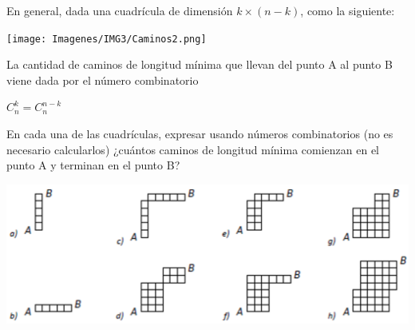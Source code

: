 \documentclass[12pt]{article}
\begin{document}
En general, dada una cuadrícula de dimensión $k \times (n-k)$, como la siguiente:

\begin{center}
    \texttt{[image: Imagenes/IMG3/Caminos2.png]}
\end{center}

La cantidad de caminos de longitud mínima que llevan del punto A al punto B viene dada por el número combinatorio 

\begin{center}
    $C^{k}_{n}=C^{n-k}_{n}$
\end{center}

\begin{problema}
    En cada una de las cuadrículas, expresar usando números combinatorios (no es necesario calcularlos) ¿cuántos caminos de longitud mínima comienzan en el punto A y terminan en el punto B?

    \begin{center}
        \includegraphics[scale=0.5]{Imagenes/IMG3/Caminos3.png}
    \end{center}
    
\end{problema}
    
\end{document}
